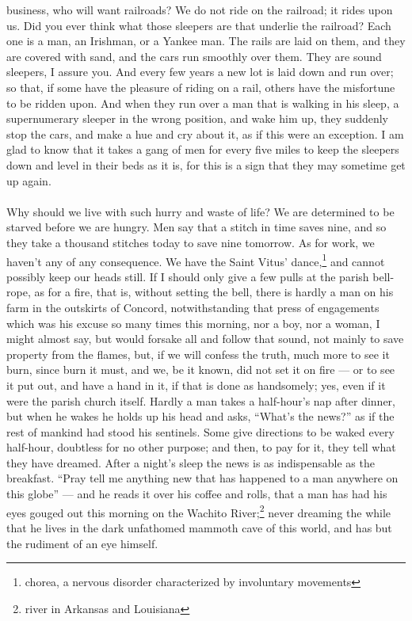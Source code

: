 \documentclass[letterpaper,12pt]{article}
\begin{document}
business, who will want railroads? We do not ride on the railroad; it rides upon
us. Did you ever think what those sleepers are that underlie the railroad? Each
one is a man, an Irishman, or a Yankee man. The rails are laid on them, and they
are covered with sand, and the cars run smoothly over them. They are sound
sleepers, I assure you. And every few years a new lot is laid down and run over;
so that, if some have the pleasure of riding on a rail, others have the
misfortune to be ridden upon. And when they run over a man that is walking in
his sleep, a supernumerary sleeper in the wrong position, and wake him up, they
suddenly stop the cars, and make a hue and cry about it, as if this were an
exception.  I am glad to know that it takes a gang of men for every five miles
to keep the sleepers down and level in their beds as it is, for this is a sign
that they may sometime get up again.

\paragraph{} Why should we live with such hurry and waste of life? We are
determined to be starved before we are hungry. Men say that a stitch in time
saves nine, and so they take a thousand stitches today to save nine tomorrow. As
for work, we haven't any of any consequence. We have the Saint Vitus'
dance,\footnote{chorea, a nervous disorder characterized by involuntary
    movements} and cannot possibly keep our heads still. If I should only give
a few pulls at the parish bell-rope, as for a fire, that is, without setting the
bell, there is hardly a man on his farm in the outskirts of Concord,
notwithstanding that press of engagements which was his excuse so many times
this morning, nor a boy, nor a woman, I might almost say, but would forsake all
and follow that sound, not mainly to save property from the flames, but, if we
will confess the truth, much more to see it burn, since burn it must, and we, be
it known, did not set it on fire --- or to see it put out, and have a hand in
it, if that is done as handsomely; yes, even if it were the parish church
itself. Hardly a man takes a half-hour's nap after dinner, but when he wakes he
holds up his head and asks, \enquote{What's the news?} as if the rest of mankind
had stood his sentinels. Some give directions to be waked every half-hour,
doubtless for no other purpose; and then, to pay for it, they tell what they
have dreamed. After a night's sleep the news is as indispensable as the
breakfast. \enquote{Pray tell me anything new that has happened to a man
    anywhere on this globe} --- and he reads it over his coffee and rolls, that
a man has had his eyes gouged out this morning on the Wachito
River;\footnote{river in Arkansas and Louisiana} never dreaming the while that
he lives in the dark unfathomed mammoth cave of this world, and has but the
rudiment of an eye himself.
\end{document}
